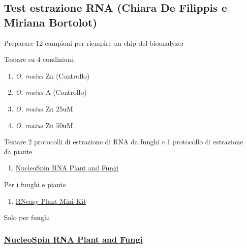 \documentclass[
]{book}
\providecommand{\tightlist}{%
  \setlength{\itemsep}{0pt}\setlength{\parskip}{0pt}}
\begin{document}
\hypertarget{test-estrazione-rna-chiara-de-filippis-e-miriana-bortolot}{%
\subsection{Test estrazione RNA (Chiara De Filippis e Miriana Bortolot)}\label{test-estrazione-rna-chiara-de-filippis-e-miriana-bortolot}}

Preparare 12 campioni per riempire un chip del bioanalyzer

Testare su 4 condizioni:

\begin{enumerate}
\def\labelenumi{\arabic{enumi}.}
\tightlist
\item
  \emph{O. maius} Zn (Controllo)\\
\item
  \emph{O. maius} A (Controllo)\\
\item
  \emph{O. maius} Zn 25uM\\
\item
  \emph{O. maius} Zn 50uM
\end{enumerate}

Testare 2 protocolli di estrazione di RNA da funghi e 1 protocollo di estrazione da piante

\begin{enumerate}
\def\labelenumi{\arabic{enumi}.}
\tightlist
\item
  \href{https://www.mn-net.com/media/pdf/a4/03/d2/Instruction-NucleoSpin-RNA-Plant-and-Fungi.pdf\#page=15\&zoom=auto,-218,581}{NucleoSpin RNA Plant and Fungi}
\end{enumerate}

Per i funghi e piante

\begin{enumerate}
\def\labelenumi{\arabic{enumi}.}
\tightlist
\item
  \href{\%22https://www.qiagen.com/us/products/discovery-and-translational-research/dna-rna-purification/rna-purification/total-rna/rneasy-plant-mini-kit/\%22}{RNeasy Plant Mini Kit}
\end{enumerate}

Solo per funghi

\hypertarget{nucleospin-rna-plant-and-fungi}{%
\subsubsection{\texorpdfstring{\href{protocols/Instruction-NucleoSpin-RNA-Plant-and-Fungi.pdf}{NucleoSpin RNA Plant and Fungi}}{NucleoSpin RNA Plant and Fungi}}\label{nucleospin-rna-plant-and-fungi}}
\end{document}
